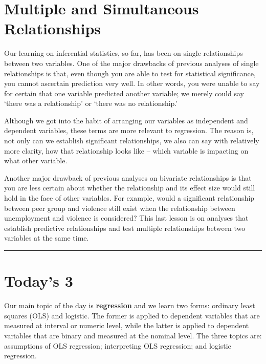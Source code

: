 \documentclass[
]{book}
\begin{document}
\hypertarget{multiple-and-simultaneous-relationships}{%
\section{Multiple and Simultaneous Relationships}\label{multiple-and-simultaneous-relationships}}

Our learning on inferential statistics, so far, has been on single relationships between two variables. One of the major drawbacks of previous analyses of single relationships is that, even though you are able to test for statistical significance, you cannot ascertain prediction very well. In other words, you were unable to say for certain that one variable predicted another variable; we merely could say `there was a relationship' or `there was no relationship.'

Although we got into the habit of arranging our variables as independent and dependent variables, these terms are more relevant to regression. The reason is, not only can we establish significant relationships, we also can say with relatively more clarity, how that relationship looks like -- which variable is impacting on what other variable.

Another major drawback of previous analyses on bivariate relationships is that you are less certain about whether the relationship and its effect size would still hold in the face of other variables. For example, would a significant relationship between peer group and violence still exist when the relationship between unemployment and violence is considered? This last lesson is on analyses that establish predictive relationships and test multiple relationships between two variables at the same time.

\begin{center}\rule{0.5\linewidth}{0.5pt}\end{center}

\hypertarget{todays-3-6}{%
\section{Today's 3}\label{todays-3-6}}

Our main topic of the day is \textbf{regression} and we learn two forms: ordinary least squares (OLS) and logistic. The former is applied to dependent variables that are measured at interval or numeric level, while the latter is applied to dependent variables that are binary and measured at the nominal level. The three topics are: assumptions of OLS regression; interpreting OLS regression; and logistic regression.
\end{document}
